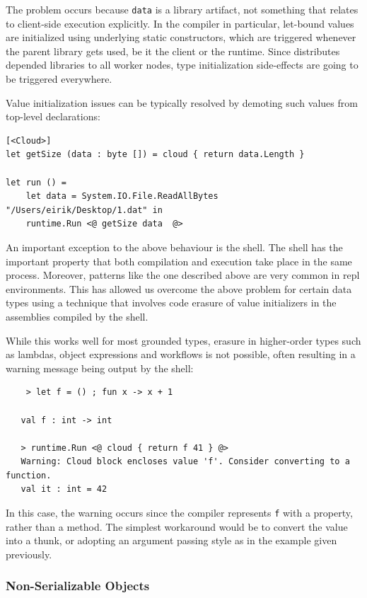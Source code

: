 The problem occurs because \texttt{data} is a library artifact, not something
that relates to client-side execution explicitly. In the \fsharp{} compiler in particular,
let-bound values are initialized using underlying static constructors, which are triggered
whenever the parent library gets used, be it the client or the runtime.
Since \mbrace{} distributes depended libraries to all worker nodes, type initialization 
side-effects are going to be triggered everywhere.

Value initialization issues can be typically resolved by demoting such values from top-level
declarations:
\begin{lstlisting}
[<Cloud>]
let getSize (data : byte []) = cloud { return data.Length }

let run () = 
	let data = System.IO.File.ReadAllBytes "/Users/eirik/Desktop/1.dat" in
	runtime.Run <@ getSize data  @>
\end{lstlisting}

An important exception to the above behaviour is the \mbrace{} shell. The shell has the 
important property that both compilation and execution take place in the same process. 
Moreover, patterns like the one described above are very common in repl environments.
This has allowed us overcome the above problem for certain data types using a technique
that involves code erasure of value initializers in the assemblies compiled by the shell.

While this works well for most grounded types, erasure in higher-order types such as lambdas,
object expressions and workflows is not possible, often resulting in a warning message being 
output by the shell:
\begin{verbatim}
    > let f = () ; fun x -> x + 1
	
   val f : int -> int

   > runtime.Run <@ cloud { return f 41 } @>
   Warning: Cloud block encloses value 'f'. Consider converting to a function.
   val it : int = 42
\end{verbatim}
In this case, the warning occurs since the \fsharp{} compiler represents \texttt f with
a \dotnet{} property, rather than a method. The simplest workaround would be to convert 
the value into a thunk, or adopting an argument passing style as in the example
given previously.

\subsubsection*{Non-Serializable Objects}

